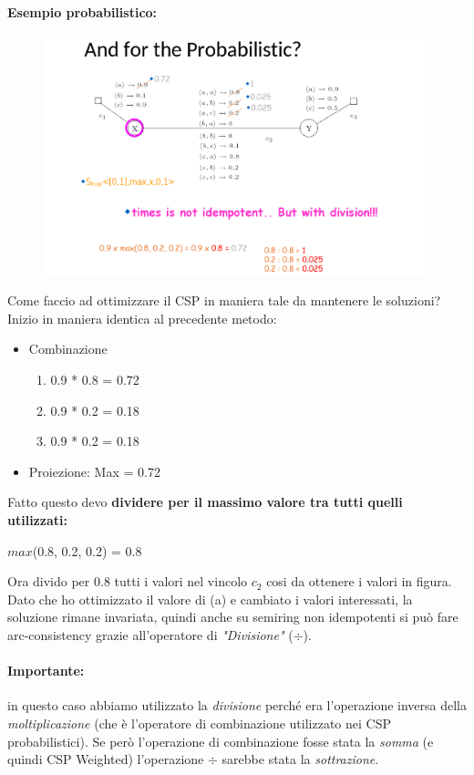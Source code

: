 \textbf{Esempio probabilistico:}

\begin{figure}[H]
    \centering
    \includegraphics[width=14cm, keepaspectratio]{img/Cap5/probabilisticmeglio.png}
\end{figure}

Come faccio ad ottimizzare il CSP in maniera tale da mantenere le soluzioni?
\\Inizio in maniera identica al precedente metodo:
\begin{itemize}
    \item Combinazione
          \begin{enumerate}
              \item 0.9 * 0.8 = 0.72
              \item 0.9 * 0.2 = 0.18
              \item 0.9 * 0.2 = 0.18
          \end{enumerate}
    \item Proiezione: Max = 0.72
\end{itemize}
\noindent Fatto questo devo \textbf{dividere per il massimo valore tra tutti
    quelli utilizzati:}
\begin{center}
    $max$(0.8, 0.2, 0.2) = 0.8
\end{center}
Ora divido per 0.8 tutti i valori nel vincolo $c_2$ cosi da ottenere i valori in
figura. Dato che ho ottimizzato il valore di (a) e cambiato i valori
interessati, la soluzione rimane invariata, quindi anche su semiring non
idempotenti si può fare arc-consistency grazie all'operatore di \textit{"Divisione"}
($\div$).

\paragraph{Importante:} in questo caso abbiamo utilizzato la
\textit{divisione} perché era l'operazione inversa della \textit{moltiplicazione} (che è
l'operatore di combinazione utilizzato nei CSP probabilistici). Se però
l'operazione di combinazione fosse stata la \textit{somma} (e quindi CSP Weighted)
l'operazione $\div$ sarebbe stata la \textit{sottrazione}.


